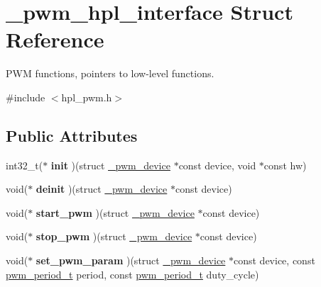 \hypertarget{struct__pwm__hpl__interface}{}\section{\+\_\+pwm\+\_\+hpl\+\_\+interface Struct Reference}
\label{struct__pwm__hpl__interface}


P\+WM functions, pointers to low-\/level functions.  




{\ttfamily \#include $<$hpl\+\_\+pwm.\+h$>$}

\subsection*{Public Attributes}
\begin{DoxyCompactItemize}
\item 
\mbox{\label{struct__pwm__hpl__interface_a0cbac907fec1983464c9a4d76fee7c39}} 
int32\+\_\+t($\ast$ {\bfseries init} )(struct \hyperlink{struct__pwm__device}{\+\_\+pwm\+\_\+device} $\ast$const device, void $\ast$const hw)
\item 
\mbox{\label{struct__pwm__hpl__interface_aafdf931ed591b7dc209fdd09df1f54c2}} 
void($\ast$ {\bfseries deinit} )(struct \hyperlink{struct__pwm__device}{\+\_\+pwm\+\_\+device} $\ast$const device)
\item 
\mbox{\label{struct__pwm__hpl__interface_aae54bf9d0a287e3235b82c65943d9e87}} 
void($\ast$ {\bfseries start\+\_\+pwm} )(struct \hyperlink{struct__pwm__device}{\+\_\+pwm\+\_\+device} $\ast$const device)
\item 
\mbox{\label{struct__pwm__hpl__interface_a0484c11e84a73f385e6383a98828ad55}} 
void($\ast$ {\bfseries stop\+\_\+pwm} )(struct \hyperlink{struct__pwm__device}{\+\_\+pwm\+\_\+device} $\ast$const device)
\item 
\mbox{\label{struct__pwm__hpl__interface_a75c97c7b773a727bec1ac5fc2490fffa}} 
void($\ast$ {\bfseries set\+\_\+pwm\+\_\+param} )(struct \hyperlink{struct__pwm__device}{\+\_\+pwm\+\_\+device} $\ast$const device, const \hyperlink{group___h_p_l_ga54b3c18a071fea0c56652e887810b3f6}{pwm\+\_\+period\+\_\+t} period, const \hyperlink{group___h_p_l_ga54b3c18a071fea0c56652e887810b3f6}{pwm\+\_\+period\+\_\+t} duty\+\_\+cycle)

\end{DoxyCompactItemize}
